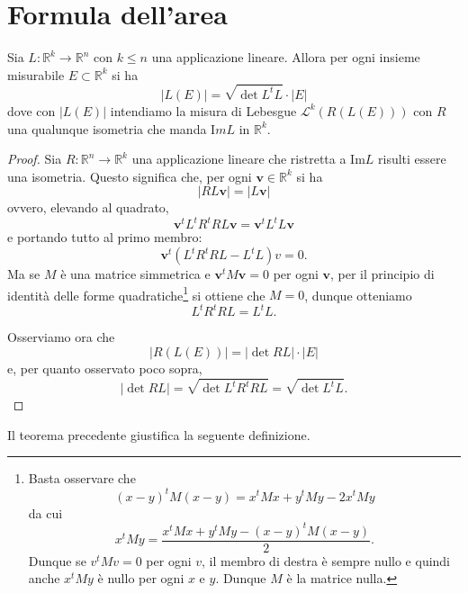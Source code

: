 \documentclass[italian,a4paper]{scrartcl}
\newcommand{\RR}{{\mathbb R}}
\renewcommand{\vec}{\mathbf}
\begin{document}
\section{Formula dell'area}
\begin{theorem}
Sia $L\colon \RR^k \to \RR^n$ con $k\le n$ una applicazione lineare.
Allora per ogni insieme misurabile $E\subset \RR^k$ si ha
\[
  \lvert L(E)\rvert = \sqrt{\det L^t L} \cdot \lvert E \rvert
\]
dove con $\lvert L(E)\rvert$ intendiamo la misura di
Lebesgue $\mathcal L^k(R(L(E)))$ con $R$ una qualunque isometria che
manda $\mathrm Im L$ in $\RR^k$.
\end{theorem}
\begin{proof}
Sia $R\colon \RR^n \to \RR^k$ una applicazione lineare che ristretta a $\mathrm{Im} L$ risulti
essere una isometria. Questo significa che, per ogni $\vec v \in
\RR^k$ si ha
\[
  \lvert R L \vec v\rvert = \lvert L \vec v\rvert
\]
ovvero, elevando al quadrato,
\[
  \vec v^t L^t R^t R L \vec v = \vec v^t L^t L \vec v
\]
e portando tutto al primo membro:
\[
 \vec v^t (L^t R^t R L - L^t L) v = 0.
\]
Ma se $M$ è una matrice simmetrica e $\vec v^tM\vec v=0$ per
ogni $\vec v$, per il principio di identità delle forme
quadratiche\footnote{Basta osservare che 
\[
(x-y)^t M (x-y) = x^t M x + y^t M y - 2 x^t M y
\]
da cui
\[
x^t M y = \frac{x^tMx + y^tMy - (x-y)^t M (x-y)}{2}.
\]
Dunque se $v^t M v = 0$ per ogni $v$, il membro di destra è sempre
nullo e quindi anche $x^t M y$ è nullo per ogni $x$ e $y$. 
Dunque $M$ è la matrice nulla.
} si ottiene che $M=0$, dunque otteniamo
\[
  L^t R^t R L = L^t L.
\]

Osserviamo ora che
\[
  \lvert R(L(E))\rvert = \lvert \det{RL} \rvert \cdot \lvert E \rvert
\]
e, per quanto osservato poco sopra,
\[
 \lvert \det RL \rvert = \sqrt{ \det L^t R^t R L }
 = \sqrt{ \det L^t L}.
\]
\end{proof}

Il teorema precedente giustifica la seguente definizione.
\end{document}
